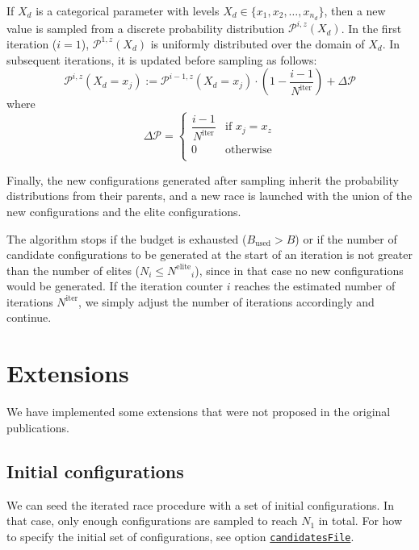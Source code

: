 \documentclass[a4paper]{article}
\newcommand{\assign}{\ensuremath{:=}}
\newcommand{\iter}{\ensuremath{i}\xspace}
\newcommand{\Budget}{\ensuremath{B}\xspace}
\newcommand{\Bused}{\ensuremath{\Budget_\text{used}}\xspace}
\newcommand{\Ncand}[1][]{\ensuremath{N_{#1}}\xspace}
\newcommand{\Niter}{\ensuremath{N^\text{iter}}\xspace}
\newcommand{\Nelite}{\ensuremath{N^\text{elite}}\xspace}
\newcommand{\parameter}[1]{\hyperlink{opt:#1}{\texttt{#1}}}
\begin{document}
If $X_d$ is a categorical parameter with levels $X_d \in \{x_1, x_2,
\dotsc, x_{n_d} \}$, then a new value is sampled from a discrete
probability distribution $\mathcal{P}^{\iter,z}(X_d)$. In the first iteration ($\iter = 1$), $\mathcal{P}^{1,z}(X_d)$ is uniformly distributed over
the domain of $X_d$. In subsequent iterations, it is updated before
sampling as follows:
%
\begin{equation}\label{eq:prob_update}
  \mathcal{P}^{\iter,z} (X_d = x_j) \assign \mathcal{P}^{\iter-1,z} (X_d = x_j)
  \cdot \left(1 - \frac{\iter-1}{\Niter}\right) + \Delta \mathcal{P}
\end{equation}
where 
\begin{equation}\label{eq:2}
  \Delta \mathcal{P} = 
  \begin{cases}
    \dfrac{\iter - 1}{\Niter} & \text{if $x_j = x_z$}\\
    0  & \text{otherwise}\\
  \end{cases}
\end{equation}
%

Finally, the new configurations generated after sampling inherit the
probability distributions from their parents, and a new race is
launched with the union of the new configurations and the elite
configurations.

The algorithm stops if the budget is exhausted ($\Bused > \Budget$) or
if the number of candidate configurations to be generated at the start
of an iteration is not greater than the number of elites ($\Ncand[\iter]
\leq \Nelite_i$), since in that case no new configurations would be
generated. If the iteration counter $\iter$ reaches the estimated
number of iterations $\Niter$, we simply adjust the number of
iterations accordingly and continue.



\section{Extensions}

We have implemented some extensions that were not proposed in the
original publications.

\subsection{Initial configurations}

We can seed the iterated race procedure with a set of initial
configurations. In that case, only enough configurations are sampled
to reach $\Ncand[1]$ in total. For how to specify the initial set of configurations, see option \parameter{candidatesFile}.
\end{document}
